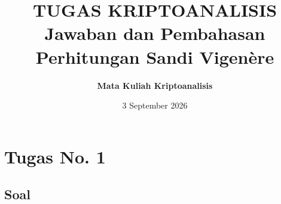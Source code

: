 \documentclass[11pt,a4paper]{article}
\title{\vspace{-1cm}\textbf{\Large TUGAS KRIPTOANALISIS}\\\large Jawaban dan Pembahasan Perhitungan Sandi Vigenère}
\author{\textbf{Mata Kuliah Kriptoanalisis}}
\date{3 September 2026}
\begin{document}
\maketitle

\vspace{-0.3cm}

\section*{Tugas No. 1}

\subsection*{Soal}
\end{document}
